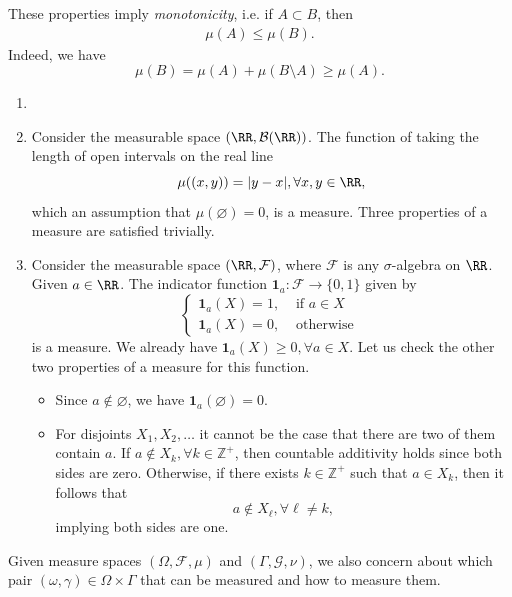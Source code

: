 \begin{remark}
  These properties imply \textit{monotonicity}, i.e. if $A\subset B$, then
  \begin{align}
    \mu(A)\le\mu(B).
  \end{align}
  Indeed, we have $$\mu(B)=\mu(A)+\mu(B\setminus A)\ge \mu(A).$$
\end{remark}

\begin{example}
  \begin{enumerate}
    \item []
    \item Consider the measurable space $(\RR, \mathcal{B}(\RR))  $. The function of taking the length of open intervals on the real line
          $$\mu((x,y))=|y-x|,\forall x,y\in\RR,$$
          which an assumption that $\mu(\varnothing)=0$, is a measure. Three properties of a measure are satisfied trivially.
    \item Consider the measurable space $(\RR, \mathcal{F})$, where $\mathcal{F}$ is any $\sigma$-algebra on $\RR$. Given $a\in\RR$. The indicator function $\mathbf{1}_a: \mathcal{F}\to\{0,1\}$ given by
          $$\begin{cases}
              \mathbf{1}_a(X)=1, & \text{ if } a\in X \\
              \mathbf{1}_a(X)=0, & \text{ otherwise }
            \end{cases}$$
          is a measure. We already have $\mathbf{1}_a(X)\ge0, \forall a\in X$. Let us check the other two properties of a measure for this function.
          \begin{itemize}
            \item Since $a\notin\varnothing$, we have $\mathbf{1}_a(\varnothing)=0$.
            \item For disjoints $X_1,X_2,\ldots$ it cannot be the case that there are two of them contain $a$. If $a\notin X_k,\forall k\in\mathbb{Z}^+$, then countable additivity holds since both sides are zero. Otherwise, if there exists $k\in \mathbb{Z}^+$ such that $a\in X_k$, then it follows that $$a\notin X_\ell, \forall \ell\ne k,$$ implying both sides are one.
          \end{itemize}
  \end{enumerate}
\end{example}

Given measure spaces $(\Omega,\mathcal{F},\mu)$ and $(\Gamma,\mathcal{G},\nu)$, we also concern about which pair $(\omega,\gamma)\in\Omega\times\Gamma$ that can be measured and how to measure them.

